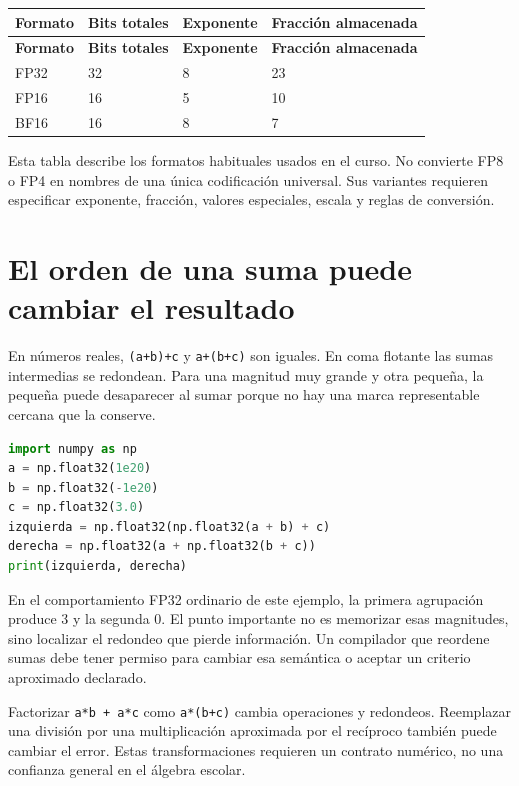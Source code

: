 \documentclass[12pt,a4paper,oneside]{report}
\begin{document}
{\small
\begin{longtable}{@{}P{0.22\textwidth}P{0.23\textwidth}P{0.23\textwidth}P{0.23\textwidth}@{}}
\toprule
\textbf{Formato} & \textbf{Bits totales} & \textbf{Exponente} & \textbf{Fracción almacenada}\\
\midrule
\endfirsthead
\toprule
\textbf{Formato} & \textbf{Bits totales} & \textbf{Exponente} & \textbf{Fracción almacenada}\\
\midrule
\endhead
FP32 & 32 & 8 & 23\\
FP16 & 16 & 5 & 10\\
BF16 & 16 & 8 & 7\\
\bottomrule
\end{longtable}
}
Esta tabla describe los formatos habituales usados en el curso. No convierte FP8 o FP4 en nombres de una única codificación universal. Sus variantes requieren especificar exponente, fracción, valores especiales, escala y reglas de conversión.

\section{El orden de una suma puede cambiar el resultado}
En números reales, \texttt{(a+b)+c} y \texttt{a+(b+c)} son iguales. En coma flotante las sumas intermedias se redondean. Para una magnitud muy grande y otra pequeña, la pequeña puede desaparecer al sumar porque no hay una marca representable cercana que la conserve.

\begin{lstlisting}[language=Python]
import numpy as np
a = np.float32(1e20)
b = np.float32(-1e20)
c = np.float32(3.0)
izquierda = np.float32(np.float32(a + b) + c)
derecha = np.float32(a + np.float32(b + c))
print(izquierda, derecha)
\end{lstlisting}
En el comportamiento FP32 ordinario de este ejemplo, la primera agrupación produce 3 y la segunda 0. El punto importante no es memorizar esas magnitudes, sino localizar el redondeo que pierde información. Un compilador que reordene sumas debe tener permiso para cambiar esa semántica o aceptar un criterio aproximado declarado.

\begin{cuidado}
Factorizar \texttt{a*b + a*c} como \texttt{a*(b+c)} cambia operaciones y redondeos. Reemplazar una división por una multiplicación aproximada por el recíproco también puede cambiar el error. Estas transformaciones requieren un contrato numérico, no una confianza general en el álgebra escolar.

\end{cuidado}
\end{document}
